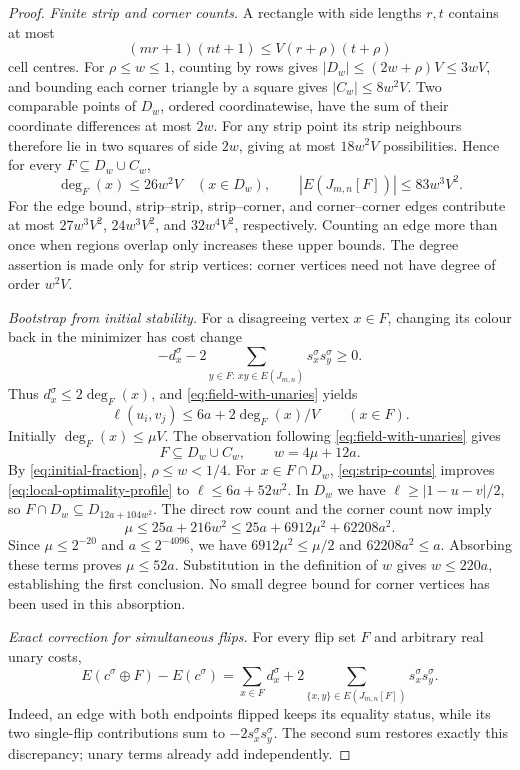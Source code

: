 \begin{proof}
\emph{Finite strip and corner counts.}
A rectangle with side lengths $r,t$ contains at most
\[
 (mr+1)(nt+1)\le V(r+\rho)(t+\rho)
\]
cell centres.  For $\rho\le w\le1$, counting by rows gives
$|D_w|\le(2w+\rho)V\le3wV$, and bounding each corner triangle by
a square gives $|C_w|\le8w^2V$.  Two comparable points of $D_w$, ordered
coordinatewise, have the sum of their coordinate differences at most
$2w$.  For any strip point its strip neighbours therefore lie in two
squares of side $2w$, giving at most $18w^2V$ possibilities.  Hence for
every $F\subseteq D_w\cup C_w$,
\begin{equation}
 \deg_F(x)\le26w^2V\quad(x\in D_w),\qquad
 |E(J_{m,n}[F])|\le83w^3V^2.
 \label{eq:strip-counts}
\end{equation}
For the edge bound, strip--strip, strip--corner, and corner--corner
edges contribute at most $27w^3V^2$, $24w^3V^2$, and $32w^4V^2$,
respectively.  Counting an edge more than once when regions overlap only
increases these upper bounds.  The degree assertion is made only for strip
vertices: corner vertices need not have degree of order $w^2V$.

\emph{Bootstrap from initial stability.}
For a disagreeing vertex $x\in F$, changing its colour back in the
minimizer has cost change
\[
 -d_x^\sigma-2\sum_{y\in F:\,xy\in E(J_{m,n})}s_x^\sigma s_y^\sigma
 \ge0.
\]
Thus $d_x^\sigma\le2\deg_F(x)$, and
\eqref{eq:field-with-unaries} yields
\begin{equation}
 \ell(u_i,v_j)\le6a+2\deg_F(x)/V\qquad(x\in F).
 \label{eq:local-optimality-profile}
\end{equation}
Initially $\deg_F(x)\le\mu V$.  The observation following
\eqref{eq:field-with-unaries} gives
\[
 F\subseteq D_w\cup C_w,
 \qquad w=4\mu+12a.
\]
By \eqref{eq:initial-fraction}, $\rho\le w<1/4$.  For
$x\in F\cap D_w$, \eqref{eq:strip-counts} improves
\eqref{eq:local-optimality-profile} to
$\ell\le6a+52w^2$.  In $D_w$ we have
$\ell\ge|1-u-v|/2$, so
$F\cap D_w\subseteq D_{12a+104w^2}$.  The direct row count and the
corner count now imply
\[
 \mu\le25a+216w^2
 \le25a+6912\mu^2+62208a^2.
\]
Since $\mu\le2^{-20}$ and $a\le2^{-4096}$, we have
$6912\mu^2\le\mu/2$ and $62208a^2\le a$.
Absorbing these terms proves $\mu\le52a$.
Substitution in the definition of $w$ gives $w\le220a$, establishing
the first conclusion.  No small degree bound for corner vertices has
been used in this absorption.

\emph{Exact correction for simultaneous flips.}
For every flip set $F$ and arbitrary real unary costs,
\begin{equation}
 E(c^\sigma\oplus F)-E(c^\sigma)
 =\sum_{x\in F}d_x^\sigma
  +2\sum_{\{x,y\}\in E(J_{m,n}[F])}s_x^\sigma s_y^\sigma.
 \label{eq:simultaneous-flips}
\end{equation}
Indeed, an edge with both endpoints flipped keeps its equality status,
while its two single-flip contributions sum to
$-2s_x^\sigma s_y^\sigma$.  The second sum restores exactly this
discrepancy; unary terms already add independently.


\end{proof}

